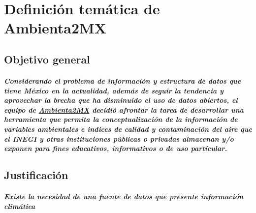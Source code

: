 \chapter {Definici\'on tem\'atica de Ambienta2MX}
  \section {Objetivo general}
    \paragraph {Considerando el problema de informaci\'on y estructura de datos que tiene M\'exico en la actualidad, adem\'as de seguir la tendencia y aprovechar la brecha que ha disminuido el uso de datos abiertos, el equipo de \underline{Ambienta2MX} decidi\'o afrontar la tarea de desarrollar una herramienta que permita la conceptualizaci\'on de la informaci\'on de variables ambientales e indices de calidad y contaminaci\'on del aire que el INEGI y otras instituciones p\'ublicas o privadas almacenan y/o exponen para fines educativos, informativos o de uso part\'icular.}
  
  \section{Justificación}
    \paragraph{Existe la necesidad de una fuente de datos que presente información climática}